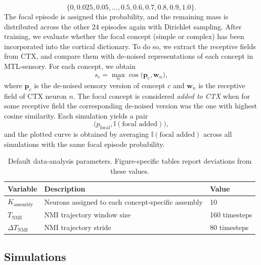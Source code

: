 \documentclass{article}
\begin{document}
\[
\{0,0.025,0.05,\dots,0.5,0.6,0.7,0.8,0.9,1.0\}.
\]
The focal episode is assigned this probability, and the remaining mass is distributed across the other $24$ episodes again with Dirichlet sampling.
\newline\newline
After training, we evaluate whether the focal concept (simple or complex) has been incorporated into the cortical dictionary. To do so, we extract the receptive fields from CTX, and compare them with de-noised representations of each concept in MTL-sensory. For each concept, we obtain
\begin{equation}
s_c=\max_n \cos\!\big(\mathbf{p}_c,\mathbf{w}_n\big),
\end{equation}
where $\mathbf{p}_c$ is the de-noised sensory version of concept $c$ and $\mathbf{w}_n$ is the receptive field of CTX neuron $n$. The focal concept is considered \emph{added to CTX} when for some receptive field the corresponding de-noised version was the one with highest cosine similarity. Each simulation yields a pair
\begin{equation}
\big( p_{\mathrm{focal}}, \mathbb{I}(\textrm{focal added})\big),
\end{equation}
and the plotted curve is obtained by averaging $\mathbb{I}(\textrm{focal added})$ across all simulations with the same focal episode probability.
\begin{table}[ht]
\centering
\caption{Default data-analysis parameters. Figure-specific tables report deviations from these values.}
\label{tab:data_analysis_defaults}
\begin{tabular}{lll}
\toprule
\textbf{Variable} & \textbf{Description} & \textbf{Value} \\
\midrule
$K_\textrm{assembly}$ & Neurons assigned to each concept-specific assembly & 10 \\
$T_\textrm{NMI}$ & NMI trajectory window size & 160 timesteps \\
$\Delta T_\textrm{NMI}$ & NMI trajectory stride & 80 timesteps \\
\bottomrule
\end{tabular}
\end{table}
\newpage
\subsection*{Simulations}
\end{document}
